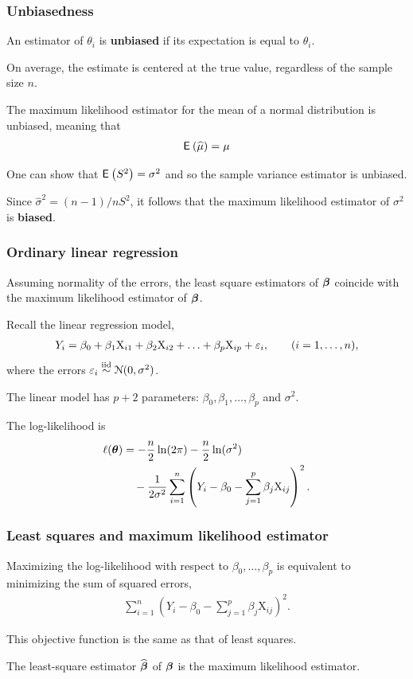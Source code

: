\documentclass{beamer}
\begin{document}
\begin{frame}
\frametitle{Unbiasedness}
\bi
\item An estimator of $\theta_i$ is \textbf{unbiased} if its expectation is equal to $\theta_i$.
\bi \item On average, the estimate is centered at the true value, regardless of the sample size $n$.\ei
\item The maximum likelihood estimator for the mean of a normal distribution is \alert{unbiased}, meaning that
\begin{align*}
{\mathsf E}_{}\left(\widehat{\mu}\right)=\mu
\end{align*}
\item One can show that ${\mathsf E}_{}\left(S^2\right)=\sigma^2$ and so the sample variance estimator is unbiased.
\item Since $\hat{\sigma}^2=(n-1)/n S^2$, it follows that the maximum likelihood estimator of $\sigma^2$ is \textbf{biased}. 
\ei
\end{frame}


\begin{frame}
\frametitle{Ordinary linear regression}
Assuming normality of the errors,  the least square estimators of $\boldsymbol {\beta}$ coincide with the maximum likelihood estimator of $\boldsymbol {\beta}$.
\bi \item 
Recall the linear regression model, 
\begin{align*}
Y_i=\beta_0+\beta_1 \mathrm{X}_{i1}+\beta_2 \mathrm{X}_{i2}+\ldots +\beta_p \mathrm{X}_{ip} + \varepsilon_i, \qquad  (i=1, \ldots, n),
\end{align*}
where the errors $ \varepsilon_i\stackrel{\textnormal{iid}}{\sim} \mathcal{N}(0, \sigma^2)$.
\item The linear model has $p+2$ parameters: $\beta_0, \beta_1, \ldots, \beta_p $ and $ \sigma^2$. 
\item The log-likelihood is 
\begin{align*}
\ell(\boldsymbol {\theta})&=-\frac{n}{2} \ln(2\pi)-\frac{n}{2} \ln (\sigma^2)\\& \quad -\frac{1}{2\sigma^2}\sum_{i=1}^n \left(Y_i-\beta_0-\sum_{j=1}^p \beta_j\mathrm{X}_{ij}\right)^2.
\end{align*}
\ei
\end{frame}


\begin{frame}
 \frametitle{Least squares and maximum likelihood estimator}
\bi
\item Maximizing the log-likelihood with respect to $\beta_0, \ldots, \beta_p$ is equivalent to
minimizing the sum of squared errors,
\begin{align*}
\sum_{i=1}^n \left(Y_i-\beta_0-\sum_{j=1}^p \beta_j\mathrm{X}_{ij}\right)^2.
\end{align*}
\item This objective function is the same as that of least squares.
\item The least-square estimator $\widehat{\boldsymbol {\beta}}$ of $\boldsymbol {\beta}$ is the maximum likelihood estimator.
\ei
\end{frame}
\end{document}
